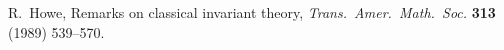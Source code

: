  R.~Howe, Remarks on classical invariant theory, \emph{Trans.\ Amer.\ Math.\ Soc.} \textbf{313} (1989) 539--570.
